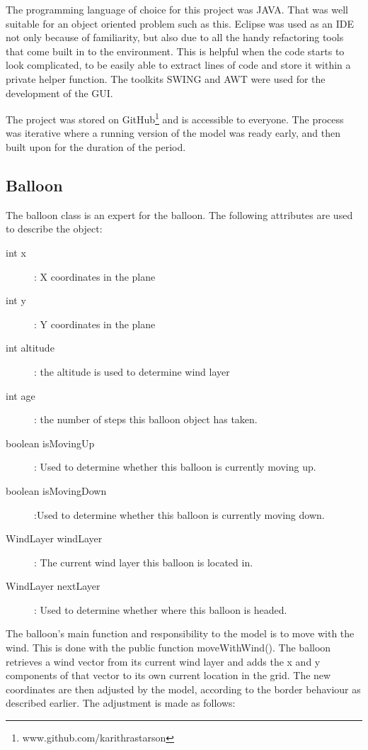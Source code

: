 The programming language of choice for this project was JAVA. That was well suitable for an object oriented problem such as this. Eclipse was used as an IDE not only because of familiarity, but also due to all the handy refactoring tools that come built in to the environment. This is helpful when the code starts to look complicated, to be easily able to extract lines of code and store it within a private helper function. The toolkits SWING and AWT were used for the development of the GUI.

The project was stored on GitHub\footnote{www.github.com/karithrastarson} and is accessible to everyone. The process was iterative where a running version of the model was ready early, and then built upon for the duration of the period.
\subsection{Balloon}

The balloon class is an expert for the balloon. The following attributes are used to describe the object:
\begin{description}
	\item[int x]: X coordinates in the plane
	\item[int y]: Y coordinates in the plane
	\item[int altitude]: the altitude is used to determine wind layer
		\item[int age]: the number of steps this balloon object has taken.
	\item[boolean isMovingUp]: Used to determine whether this balloon is currently moving up.
	\item[boolean isMovingDown]:Used to determine whether this balloon is currently moving down.
	\item[WindLayer windLayer]: The current wind layer this balloon is located in.
	\item[WindLayer nextLayer]: Used to determine whether where this balloon is headed.
\end{description}

The balloon's main function and responsibility to the model is to move with the wind. This is done with the public function moveWithWind(). The balloon retrieves a wind vector from its current wind layer and adds the x and y components of that vector to its own current location in the grid. The new coordinates are then adjusted by the model, according to the border behaviour as described earlier. The adjustment is made as follows:

